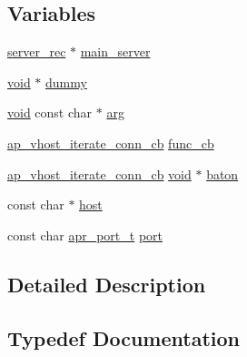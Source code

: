 \subsection*{Variables}
\begin{DoxyCompactItemize}
\item 
\hyperlink{structserver__rec}{server\+\_\+rec} $\ast$ \hyperlink{group__APACHE__CORE__VHOST_gaa3a1ee5e0636008d75c4c512da9f150c}{main\+\_\+server}
\item 
\hyperlink{group__MOD__ISAPI_gacd6cdbf73df3d9eed42fa493d9b621a6}{void} $\ast$ \hyperlink{group__APACHE__CORE__VHOST_ga99dc3b67257851cb91efea473083cd0f}{dummy}
\item 
\hyperlink{group__MOD__ISAPI_gacd6cdbf73df3d9eed42fa493d9b621a6}{void} const char $\ast$ \hyperlink{group__APACHE__CORE__VHOST_gaf6517210150d97cd5cb8a17e3768770d}{arg}
\item 
\hyperlink{group__APACHE__CORE__VHOST_gab90f6f97cd2bc1538be783916fad41bb}{ap\+\_\+vhost\+\_\+iterate\+\_\+conn\+\_\+cb} \hyperlink{group__APACHE__CORE__VHOST_ga3d6df6e80e0bcd0b484638e4afae4768}{func\+\_\+cb}
\item 
\hyperlink{group__APACHE__CORE__VHOST_gab90f6f97cd2bc1538be783916fad41bb}{ap\+\_\+vhost\+\_\+iterate\+\_\+conn\+\_\+cb} \hyperlink{group__MOD__ISAPI_gacd6cdbf73df3d9eed42fa493d9b621a6}{void} $\ast$ \hyperlink{group__APACHE__CORE__VHOST_ga8d85017aeedbe9c2ba84a663de5db045}{baton}
\item 
const char $\ast$ \hyperlink{group__APACHE__CORE__VHOST_ga8c8ad0616f1a1fed66e67a90a116a76c}{host}
\item 
const char \hyperlink{group__apr__network__io_gaa670a71960f6eb4fe0d0de2a1e7aba03}{apr\+\_\+port\+\_\+t} \hyperlink{group__APACHE__CORE__VHOST_ga225c76c246a5cc263c5a2628eb99353e}{port}
\end{DoxyCompactItemize}


\subsection{Detailed Description}


\subsection{Typedef Documentation}
